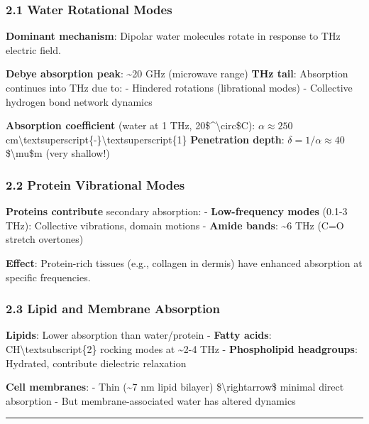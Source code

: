 \subsubsection{2.1 Water Rotational Modes}\label{water-rotational-modes}

\textbf{Dominant mechanism}: Dipolar water molecules rotate in response
to THz electric field.

\textbf{Debye absorption peak}: \textasciitilde20 GHz (microwave range)
\textbf{THz tail}: Absorption continues into THz due to: - Hindered
rotations (librational modes) - Collective hydrogen bond network
dynamics

\textbf{Absorption coefficient} (water at 1 THz,
20\$\^{}\textbackslash circ\$C): \(\alpha \approx 250\)
cm\textbackslash textsuperscript\{-\}\textbackslash textsuperscript\{1\}
\textbf{Penetration depth}: \(\delta = 1/\alpha \approx 40\)
\$\textbackslash mu\$m (very shallow!)

\subsubsection{2.2 Protein Vibrational
Modes}\label{protein-vibrational-modes}

\textbf{Proteins contribute} secondary absorption: -
\textbf{Low-frequency modes} (0.1-3 THz): Collective vibrations, domain
motions - \textbf{Amide bands}: \textasciitilde6 THz (C=O stretch
overtones)

\textbf{Effect}: Protein-rich tissues (e.g., collagen in dermis) have
enhanced absorption at specific frequencies.

\subsubsection{2.3 Lipid and Membrane
Absorption}\label{lipid-and-membrane-absorption}

\textbf{Lipids}: Lower absorption than water/protein - \textbf{Fatty
acids}: CH\textbackslash textsubscript\{2\} rocking modes at
\textasciitilde2-4 THz - \textbf{Phospholipid headgroups}: Hydrated,
contribute dielectric relaxation

\textbf{Cell membranes}: - Thin (\textasciitilde7 nm lipid bilayer)
\$\textbackslash rightarrow\$ minimal direct absorption - But
membrane-associated water has altered dynamics

\begin{center}\rule{0.5\linewidth}{0.5pt}\end{center}

